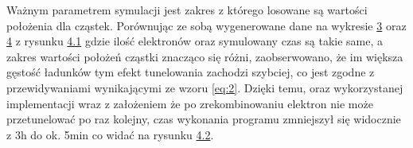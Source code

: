 Ważnym parametrem symulacji jest zakres z którego losowane są wartości położenia dla cząstek. Porównując ze sobą wygenerowane dane na wykresie  \hyperref[wykres:1]{3} oraz \hyperref[wykres:2]{4} z rysunku \hyperref[rys:1]{4.1} gdzie ilość elektronów oraz symulowany czas są takie same, a zakres wartości położeń cząstki znacząco się różni, zaobserwowano, że im większa gęstość ładunków tym efekt tunelowania zachodzi szybciej, co jest zgodne z przewidywaniami wynikającymi ze wzoru \ref{eq:2}. Dzięki temu, oraz wykorzystanej implementacji wraz z założeniem że po zrekombinowaniu elektron nie może przetunelować po raz kolejny, czas wykonania programu zmniejszył się widocznie z 3h do ok. 5min co widać na rysunku \hyperref[rys:2]{4.2}. 
